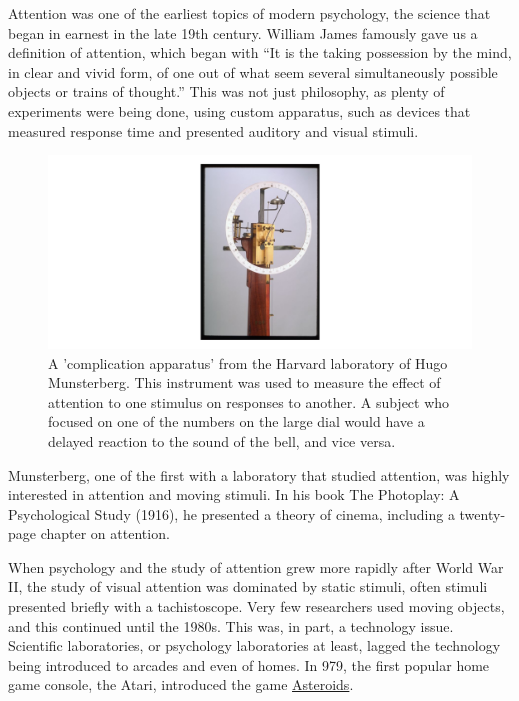 \documentclass[
]{book}
\begin{document}
Attention was one of the earliest topics of modern psychology, the science that began in earnest in the late 19th century. William James famously gave us a definition of attention, which began with ``It is the taking possession by the mind, in clear and vivid form, of one out of what seem several simultaneously possible objects or trains of thought.'' This was not just philosophy, as plenty of experiments were being done, using custom apparatus, such as devices that measured response time and presented auditory and visual stimuli.

\begin{figure}
\includegraphics[width=1\linewidth]{imagesForRmd/historical/complicationApparatus} \caption{A 'complication apparatus' from the Harvard laboratory of Hugo Munsterberg. This instrument was used to measure the effect of attention to one stimulus on responses to another.  A subject who focused on one of the numbers on the large dial would have a delayed reaction to the sound of the bell, and vice versa.}\label{fig:complication}
\end{figure}

Munsterberg, one of the first with a laboratory that studied attention, was highly interested in attention and moving stimuli. In his book The Photoplay: A Psychological Study (1916), he presented a theory of cinema, including a twenty-page chapter on attention.

When psychology and the study of attention grew more rapidly after World War II, the study of visual attention was dominated by static stimuli, often stimuli presented briefly with a tachistoscope. Very few researchers used moving objects, and this continued until the 1980s. This was, in part, a technology issue. Scientific laboratories, or psychology laboratories at least, lagged the technology being introduced to arcades and even of homes. In 979, the first popular home game console, the Atari, introduced the game \href{https://youtube.com/embed/YJZ0hB0Vnyk}{Asteroids}.
\end{document}
